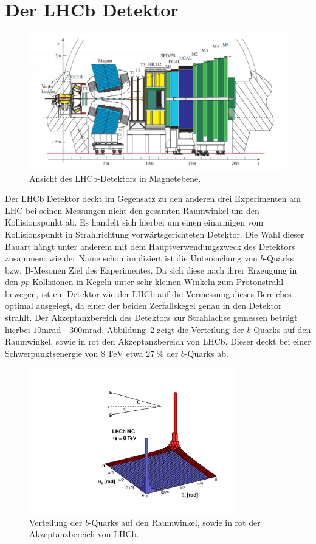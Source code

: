 \section{Der LHCb Detektor}
%
\begin{figure}[H]
  \centering
      \includegraphics[width=\textwidth]{Plots/lhcb.pdf}
  \caption{Ansicht des LHCb-Detektors in Magnetebene.\cite{lhcb}}
  \label{fig:lhcb}
\end{figure}
%
Der LHCb Detektor deckt im Gegensatz zu den anderen drei Experimenten am LHC bei seinen Messungen nicht den gesamten Raumwinkel um den Kollisionspunkt ab. Es handelt sich hierbei um einen einarmigen vom Kollisionspunkt in Strahlrichtung vorwärtsgerichteten Detektor. Die Wahl dieser Bauart hängt unter anderem mit dem Hauptverwendungszweck des Detektors zusammen: wie der Name schon impliziert ist die Untersuchung von $b$-Quarks bzw. B-Mesonen Ziel des Experimentes. Da sich diese nach ihrer Erzeugung in den $pp$-Kollisionen in Kegeln unter sehr kleinen Winkeln zum Protonstrahl bewegen, ist ein Detektor wie der LHCb auf die Vermessung dieses Bereiches optimal ausgelegt, da einer der beiden Zerfallskegel genau in den Detektor strahlt. Der Akzeptanzbereich des Detektors zur Strahlachse gemessen beträgt hierbei $10$mrad - $300$mrad. Abbildung~\ref{fig:lhcb_angle} zeigt die Verteilung der $b$-Quarks auf den Raumwinkel, sowie in rot den Akzeptanzbereich von LHCb. Dieser deckt bei einer Schwerpunktsenergie von $\SI{8}{\tera\electronvolt}$ etwa $\SI{27}{\percent}$ der $b$-Quarks ab\cite{rad}.\\
%
\begin{figure}[H]
  \centering
      \includegraphics[width=0.8\textwidth]{Plots/08_rad_acc_scheme_left.pdf}
  \caption{Verteilung der $b$-Quarks auf den Raumwinkel, sowie in rot der Akzeptanzbereich von LHCb\cite{rad_pic}.}
  \label{fig:lhcb_angle}
\end{figure}
